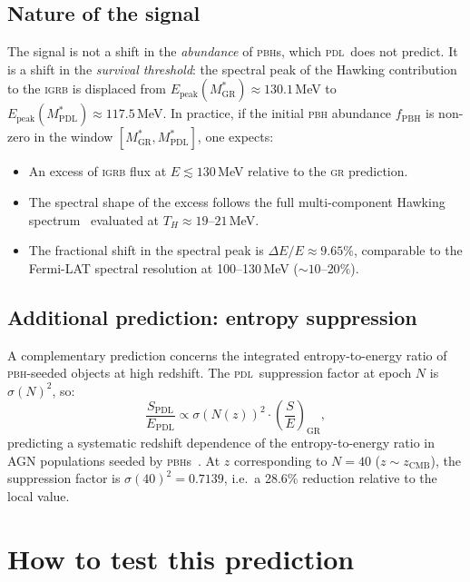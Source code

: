 \documentclass[12pt, a4paper]{article}
\theoremstyle{definition}
\newcommand{\PDL}{\textsc{pdl}}
\newcommand{\MstarGR}{M^{*}_{\mathrm{GR}}}
\newcommand{\MstarPDL}{M^{*}_{\mathrm{PDL}}}
\begin{document}
\subsection{Nature of the signal}

The signal is not a shift in the \emph{abundance} of \textsc{pbh}s, which \PDL\ does not predict. It is a shift in the \emph{survival threshold}: the spectral peak of the Hawking contribution to the \textsc{igrb} is displaced from $E_{\mathrm{peak}}(\MstarGR) \approx 130.1$\,MeV to $E_{\mathrm{peak}}(\MstarPDL) \approx 117.5$\,MeV. In practice, if the initial \textsc{pbh} abundance $f_{\mathrm{PBH}}$ is non-zero in the window $[\MstarGR, \MstarPDL]$, one expects:
\begin{itemize}
  \item An excess of \textsc{igrb} flux at $E \lesssim 130$\,MeV relative to the \textsc{gr} prediction.
  \item The spectral shape of the excess follows the full multi-component Hawking spectrum~\cite{Carlini2025,BlackHawk} evaluated at $T_H \approx 19$--$21$\,MeV.
  \item The fractional shift in the spectral peak is $\Delta E/E \approx 9.65\%$, comparable to the Fermi-LAT spectral resolution at 100--130\,MeV ($\sim 10$--$20\%$).
\end{itemize}

\subsection{Additional prediction: entropy suppression}

A complementary prediction concerns the integrated entropy-to-energy ratio of \textsc{pbh}-seeded objects at high redshift. The \PDL\ suppression factor at epoch $N$ is $\sigma(N)^2$, so:
\begin{equation}
  \frac{S_{\mathrm{PDL}}}{E_{\mathrm{PDL}}} \propto \sigma(N(z))^2 \cdot \left(\frac{S}{E}\right)_{\mathrm{GR}},
\end{equation}
predicting a systematic redshift dependence of the entropy-to-energy ratio in AGN populations seeded by \textsc{pbh}s~\cite{D38}. At $z$ corresponding to $N = 40$ ($z \sim z_{\mathrm{CMB}}$), the suppression factor is $\sigma(40)^2 = 0.7139$, i.e.\ a 28.6\% reduction relative to the local value.

\section{How to test this prediction}
\end{document}
